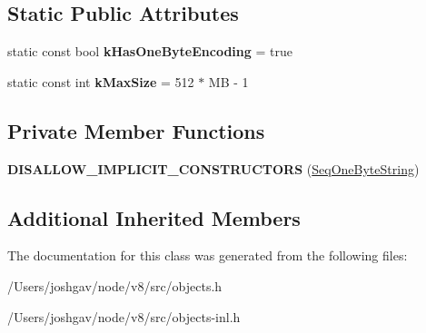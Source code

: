 \subsection*{Static Public Attributes}
\begin{DoxyCompactItemize}
\item 
static const bool {\bfseries k\+Has\+One\+Byte\+Encoding} = true\hypertarget{classv8_1_1internal_1_1_seq_one_byte_string_a3f47a8d6c036b7cffa6ea7c1133a56d4}{}\label{classv8_1_1internal_1_1_seq_one_byte_string_a3f47a8d6c036b7cffa6ea7c1133a56d4}

\item 
static const int {\bfseries k\+Max\+Size} = 512 $\ast$ MB -\/ 1\hypertarget{classv8_1_1internal_1_1_seq_one_byte_string_af5744767fa5422c6d3a5b046f5f7090a}{}\label{classv8_1_1internal_1_1_seq_one_byte_string_af5744767fa5422c6d3a5b046f5f7090a}

\end{DoxyCompactItemize}
\subsection*{Private Member Functions}
\begin{DoxyCompactItemize}
\item 
{\bfseries D\+I\+S\+A\+L\+L\+O\+W\+\_\+\+I\+M\+P\+L\+I\+C\+I\+T\+\_\+\+C\+O\+N\+S\+T\+R\+U\+C\+T\+O\+RS} (\hyperlink{classv8_1_1internal_1_1_seq_one_byte_string}{Seq\+One\+Byte\+String})\hypertarget{classv8_1_1internal_1_1_seq_one_byte_string_a82332ba25720676524437258b070158a}{}\label{classv8_1_1internal_1_1_seq_one_byte_string_a82332ba25720676524437258b070158a}

\end{DoxyCompactItemize}
\subsection*{Additional Inherited Members}


The documentation for this class was generated from the following files\+:\begin{DoxyCompactItemize}
\item 
/\+Users/joshgav/node/v8/src/objects.\+h\item 
/\+Users/joshgav/node/v8/src/objects-\/inl.\+h\end{DoxyCompactItemize}
